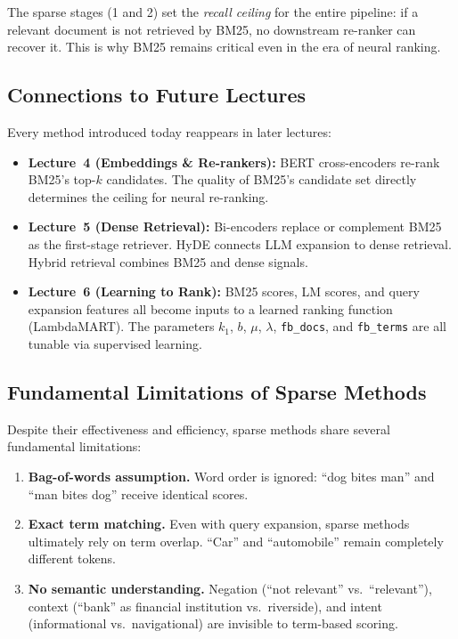 \documentclass[11pt,a4paper]{article}
\theoremstyle{definition}
\theoremstyle{plain}
\begin{document}
The sparse stages (1 and 2) set the \emph{recall ceiling} for the entire pipeline: if a relevant document is not retrieved by BM25, no downstream re-ranker can recover it. This is why BM25 remains critical even in the era of neural ranking.

\subsection{Connections to Future Lectures}

Every method introduced today reappears in later lectures:
\begin{itemize}
    \item \textbf{Lecture~4 (Embeddings \& Re-rankers):} BERT cross-encoders re-rank BM25's top-$k$ candidates. The quality of BM25's candidate set directly determines the ceiling for neural re-ranking.
    
    \item \textbf{Lecture~5 (Dense Retrieval):} Bi-encoders replace or complement BM25 as the first-stage retriever. HyDE connects LLM expansion to dense retrieval. Hybrid retrieval combines BM25 and dense signals.
    
    \item \textbf{Lecture~6 (Learning to Rank):} BM25 scores, LM scores, and query expansion features all become inputs to a learned ranking function (LambdaMART). The parameters $k_1$, $b$, $\mu$, $\lambda$, \texttt{fb\_docs}, and \texttt{fb\_terms} are all tunable via supervised learning.
\end{itemize}

\subsection{Fundamental Limitations of Sparse Methods}

Despite their effectiveness and efficiency, sparse methods share several fundamental limitations:
\begin{enumerate}
    \item \textbf{Bag-of-words assumption.} Word order is ignored: ``dog bites man'' and ``man bites dog'' receive identical scores.
    
    \item \textbf{Exact term matching.} Even with query expansion, sparse methods ultimately rely on term overlap. ``Car'' and ``automobile'' remain completely different tokens.
    
    \item \textbf{No semantic understanding.} Negation (``not relevant'' vs.\ ``relevant''), context (``bank'' as financial institution vs.\ riverside), and intent (informational vs.\ navigational) are invisible to term-based scoring.
\end{enumerate}
\end{document}
